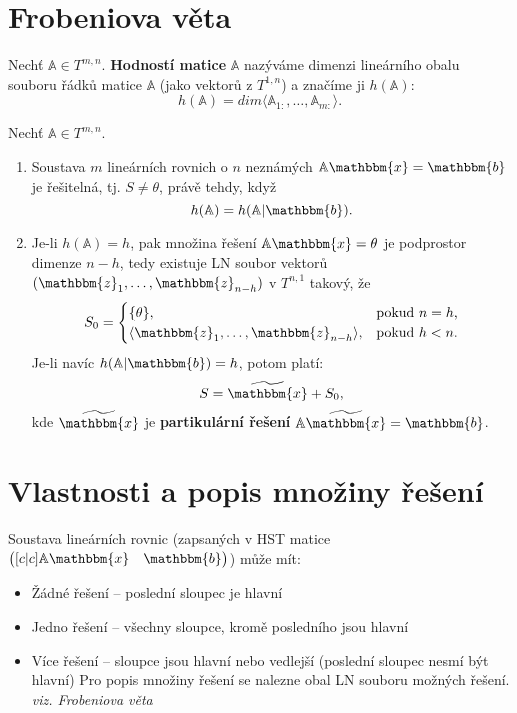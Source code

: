 \documentclass{szzclass}
\begin{document}
\tableofcontents
\newpage

\section{Frobeniova věta}
\begin{definition}
Nechť $\mathbb{A}\in T^{m,n}$. \textbf{Hodností matice} $\mathbb{A}$ nazýváme dimenzi lineárního obalu souboru řádků matice $\mathbb{A}$ (jako vektorů z $T^{1,n}$) a značíme ji $h(\mathbb{A})$:
\begin{equation}
  h(\mathbb{A})=dim\langle \mathbb{A}_{1:},\dots,\mathbb{A}_{m:}\rangle.
\end{equation}
\end{definition}

\begin{theorem}
Nechť $\mathbb{A}\in T^{m,n}$.
\begin{enumerate}
\item Soustava $m$ lineárních rovnich o $n$ neznámých $\mathbb{A} \mathbbm{x}=\mathbbm{b}$ je řešitelná, tj. $S\neq\theta$, právě tehdy, když
$$
h(\mathbb{A})=h(\mathbb{A} | \mathbbm{b}).
$$
\item Je-li $h(\mathbb{A})=h$, pak množina řešení $\mathbb{A} \mathbbm{x}=\theta$ je podprostor dimenze $n-h$, tedy existuje LN soubor vektorů $(\mathbbm{z}_1,\dots,\mathbbm{z}_{n-h})$ v $T^{n,1}$ takový, že
$$ S_0=\begin{cases}
       \{\theta\}, & \text{pokud $n=h$,} \\
       \langle \mathbbm{z}_1,\dots,\mathbbm{z}_{n-h}\rangle, & \text{pokud $h<n$.}
       \end{cases}
$$
Je-li navíc $h(\mathbb{A}|\mathbbm{b})=h$, potom platí:
$$
S=\widetilde{\mathbbm{x}} + S_0,
$$ kde $\widetilde{\mathbbm{x}}$ je \textbf{partikulární řešení} $\mathbb{A} \widetilde{\mathbbm{x}}=\mathbbm{b}$.
\end{enumerate}
\end{theorem}

\section{Vlastnosti a popis množiny řešení}
Soustava lineárních rovnic (zapsaných v HST matice $\begin{pmatrix}[c|c]\mathbb{A}\mathbbm{x}&\mathbbm{b}\end{pmatrix}$) může mít:
\begin{itemize}
\item Žádné řešení -- poslední sloupec je hlavní
\item Jedno řešení -- všechny sloupce, kromě posledního jsou hlavní
\item Více řešení -- sloupce jsou hlavní nebo vedlejší (poslední sloupec nesmí být hlavní)
Pro popis množiny řešení se nalezne obal LN souboru možných řešení. \emph{viz. Frobeniova věta}
\end{itemize}
\end{document}
